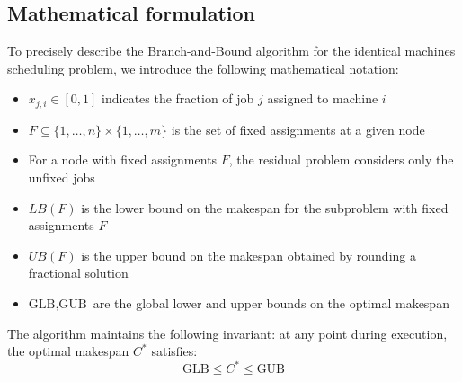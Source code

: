 \subsection{Mathematical formulation}
To precisely describe the Branch-and-Bound algorithm for the identical machines scheduling problem, we introduce the following mathematical notation:
\begin{itemize}
    \item $x_{j,i} \in [0,1]$ indicates the fraction of job $j$ assigned to machine $i$
    \item $F \subseteq \{1,\ldots,n\} \times \{1,\ldots,m\}$ is the set of fixed assignments at a given node
    \item For a node with fixed assignments $F$, the residual problem considers only the unfixed jobs
    \item $LB(F)$ is the lower bound on the makespan for the subproblem with fixed assignments $F$
    \item $UB(F)$ is the upper bound on the makespan obtained by rounding a fractional solution
    \item $\text{GLB}, \text{GUB}$ are the global lower and upper bounds on the optimal makespan
\end{itemize}

The algorithm maintains the following invariant: at any point during execution, the optimal makespan $C^*$ satisfies:
\begin{equation}
\text{GLB} \leq C^* \leq \text{GUB}
\end{equation}

